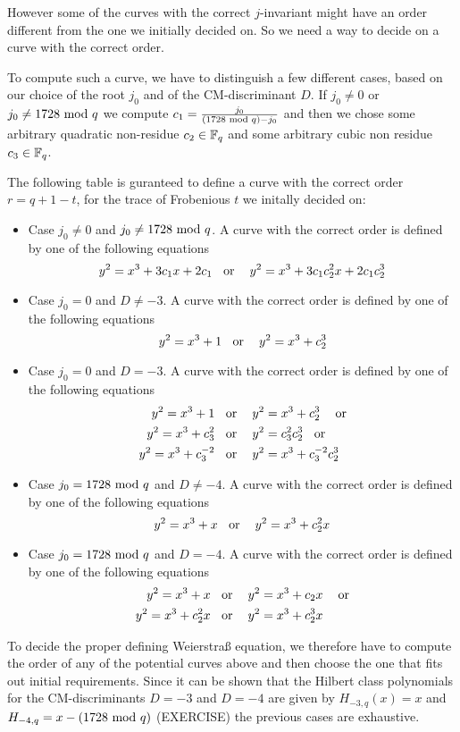However some of the curves with the correct $j$-invariant might have an order different from the one we initially decided on. So we need a way to decide on a curve with the correct order.

To compute such a curve, we have to distinguish a few different cases, based on our choice of the root $j_0$ and of the CM-discriminant $D$. If $j_0\neq 0$ or $j_0\neq 1728 \text{ mod } q$ we compute $c_1=\frac{j_0}{(1728 \text{ mod } q) -j_0}$ and then we chose some arbitrary quadratic non-residue $c_2\in \mathbb{F}_q$ and some arbitrary cubic non residue $c_3\in \mathbb{F}_q$.

The following table is guranteed to define a curve with the correct order $r= q+1 -t$, for the trace of Frobenious $t$ we initally decided on:
\begin{itemize}
\item Case $j_0 \neq 0 $ and $j_0\neq 1728 \text{ mod } q$. A curve with the correct order is defined by one of the following equations
\begin{equation}
y^2 = x^3 + 3c_1x + 2c_1 \text{\;\; or \;\; } y^2 = x^3 + 3c_1c_2^2x + 2c_1c_2^3
\end{equation}
\item Case $j_0 = 0 $ and $D\neq -3$. A curve with the correct order is defined by one of the following equations
\begin{equation}
y^2 = x^3 + 1 \text{\;\; or \;\; } y^2 = x^3 + c_2^3
\end{equation}
\item Case $j_0 = 0 $ and $D= -3$. A curve with the correct order is defined by one of the following equations
\begin{align*}
y^2 = x^3 +1 & \text{\;\; or \;\; } y^2 = x^3 + c_2^3 \text{ \;\; or}\\
y^2 = x^3 + c_3^2 & \text{\;\; or \;\; } y^2 = c_3^2 c_2^3 \text{\;\; or}\\
y^2 = x^3 + c_3^{-2} & \text{\;\; or \;\; }  y^2 = x^3 + c_3^{-2}c_2^3
\end{align*}
\item Case $j_0 = 1728 \text{ mod } q $ and $D\neq -4$. A curve with the correct order is defined by one of the following equations
\begin{equation}
y^2 = x^3 + x \text{\;\; or \;\; } y^2 = x^3 + c_2^2x
\end{equation}
\item Case $j_0 = 1728 \text{ mod } q $ and $D= -4$. A curve with the correct order is defined by one of the following equations
\begin{align*}
y^2 = x^3 +x & \text{\;\; or \;\; } y^2 = x^3 + c_2x \text{ \;\; or}\\
y^2 = x^3 + c_2^2x & \text{\;\; or \;\; } y^2 = x^3 + c_2^3x
\end{align*}
\end{itemize}
To decide the proper defining Weierstraß equation, we therefore have to compute the order of any of the potential curves above and then choose the one that fits out initial requirements. Since it can be shown that the Hilbert class polynomials for the CM-discriminants $D=-3$ and $D=-4$ are given by  $H_{-3,q}(x)=x$ and $H_{-4,q}= x-(1728 \text{ mod } q)$ (EXERCISE) the previous cases are exhaustive.

